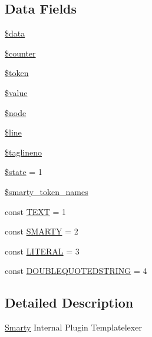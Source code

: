 \subsection*{Data Fields}
\begin{DoxyCompactItemize}
\item 
\hyperlink{class_smarty___internal___templatelexer_a6efc15b5a2314dd4b5aaa556a375c6d6}{\$data}
\item 
\hyperlink{class_smarty___internal___templatelexer_adc0a189fac719187ba2e6f01ca0f2466}{\$counter}
\item 
\hyperlink{class_smarty___internal___templatelexer_a00ae4fcafb1145f5e968bdf920f83e2e}{\$token}
\item 
\hyperlink{class_smarty___internal___templatelexer_a0f298096f322952a72a50f98a74c7b60}{\$value}
\item 
\hyperlink{class_smarty___internal___templatelexer_a15955933e72700564e1a76d7f97c1ac7}{\$node}
\item 
\hyperlink{class_smarty___internal___templatelexer_a52f469b0182d9abac2d0f20548680c9c}{\$line}
\item 
\hyperlink{class_smarty___internal___templatelexer_ab000bee82acecce8c3512b55461f3866}{\$taglineno}
\item 
\hyperlink{class_smarty___internal___templatelexer_ae82306c4f2d17d8dd5c7d8d916b33bed}{\$state} = 1
\item 
\hyperlink{class_smarty___internal___templatelexer_a1fec71dfba5804095f77f513d402aea2}{\$smarty\+\_\+token\+\_\+names}
\item 
const \hyperlink{class_smarty___internal___templatelexer_a653f16b93fcf9478a4317617e95b01d2}{T\+E\+X\+T} = 1
\item 
const \hyperlink{class_smarty___internal___templatelexer_aa641d1ecbdfabeefef1870d990c9fa3f}{S\+M\+A\+R\+T\+Y} = 2
\item 
const \hyperlink{class_smarty___internal___templatelexer_af67e1d30de8b754b676c047149f0cc8a}{L\+I\+T\+E\+R\+A\+L} = 3
\item 
const \hyperlink{class_smarty___internal___templatelexer_ac16a7aab80a01216d6dcce0cbaad95d5}{D\+O\+U\+B\+L\+E\+Q\+U\+O\+T\+E\+D\+S\+T\+R\+I\+N\+G} = 4
\end{DoxyCompactItemize}


\subsection{Detailed Description}
\hyperlink{class_smarty}{Smarty} Internal Plugin Templatelexer 

